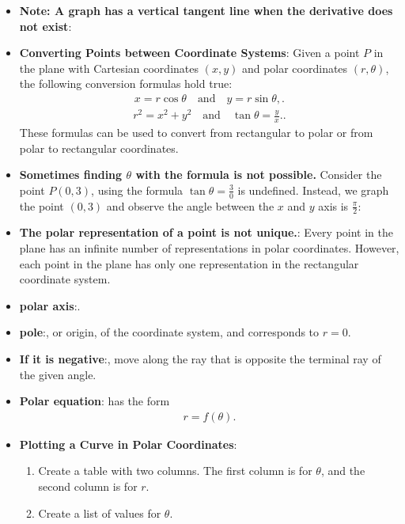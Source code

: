 \documentclass{report}
\begin{document}
\begin{itemize}
        \item \textbf{Note: A graph has a vertical tangent line when the derivative does not exist}:
        \item \textbf{Converting Points between Coordinate Systems}: 
            Given a point \( P \) in the plane with Cartesian coordinates \((x, y)\) and polar coordinates \((r, \theta)\), the following conversion formulas hold true:
            \begin{align*}
                x = r \cos \theta \quad \text{and} \quad y = r \sin \theta,
            .\end{align*}
            \begin{align*}
                r^2 = x^2 + y^2 \quad \text{and} \quad \tan \theta = \frac{y}{x}.
            .\end{align*}
            These formulas can be used to convert from rectangular to polar or from polar to rectangular coordinates.
        \item \textbf{Sometimes finding $\theta$ with the formula is not possible.} Consider the point $P(0,3)$, using the formula $\tan{\theta } = \frac{3}{0}$ is undefined. Instead, we graph the point $(0,3)$ and observe the angle between the $x$ and $y$ axis is $\frac{\pi}{2}:$ 
        \item \textbf{The polar representation of a point is not unique.}: Every point in the plane has an infinite number of representations in polar coordinates. However, each point in the plane has only one representation in the rectangular coordinate system.
        \item \textbf{polar axis}:. 
        \item \textbf{pole}:, or origin, of the coordinate system, and corresponds to  $r=0$.
        \item \textbf{If it is negative}:, move along the ray that is opposite the terminal ray of the given angle.
        \item \textbf{Polar equation}: has the form
            \begin{align*}
                r = f(\theta )
            .\end{align*}
        \item \textbf{Plotting a Curve in Polar Coordinates}:
            \begin{enumerate}
                \item Create a table with two columns. The first column is for \( \theta \), and the second column is for \( r \).
                \item Create a list of values for \( \theta \).

\end{enumerate}
\end{itemize}
\end{document}
